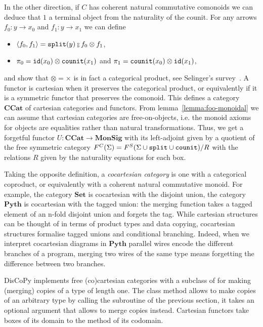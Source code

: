 In the other direction, if $C$ has coherent natural commutative comonoids we can deduce that $1$ a terminal object from the naturality of the counit.
For any arrows $f_0 : y \to x_0$ and $f_1 : y \to x_1$ we can define
\begin{itemize}
\item $\langle f_0, f_1 \rangle = \ttsplit(y) \fcmp f_0 \otimes f_1$,
\item $\pi_0 = \mathtt{id}(x_0) \otimes \mathtt{counit}(x_1)$ and $\pi_1 = \mathtt{counit}(x_0) \otimes \mathtt{id}(x_1)$,
\end{itemize}
and show that $\otimes = \times$ is in fact a categorical product, see Selinger's survey~\cite[Section 6.1]{Selinger10}.
A functor is cartesian when it preserves the categorical product, or equivalently if it is a symmetric functor that preserves the comonoid.
This defines a category $\mathbf{CCat}$ of cartesian categories and functors.
From lemma~\ref{lemma:foo-monoidal} we can assume that cartesian categories are free-on-objects, i.e. the monoid axioms for objects are equalities rather than natural transformations.
Thus, we get a forgetful functor $U : \mathbf{CCat} \to \mathbf{MonSig}$ with its left-adjoint given by a quotient of the free symmetric category $F^C(\Sigma) = F^S(\Sigma \cup \mathtt{split} \cup \mathtt{counit}) / R$ with the relations $R$ given by the naturality equations for each box.

Taking the opposite definition, a \emph{cocartesian category} is one with a categorical coproduct, or equivalently with a coherent natural commutative monoid.
For example, the category $\mathbf{Set}$ is cocartesian with the disjoint union, the category $\mathbf{Pyth}$ is cocartesian with the tagged union: the merging function takes a tagged element of an n-fold disjoint union and forgets the tag.
While cartesian structures can be thought of in terms of product types and data copying, cocartesian structures formalise tagged unions and conditional branching.
Indeed, when we interpret cocartesian diagrams in $\mathbf{Pyth}$ parallel wires encode the different branches of a program, merging two wires of the same type means forgetting the difference between two branches.

DisCoPy implements free (co)cartesian categories with a subclass of  for making (merging)  copies of a type  of length one.
The class method  allows to make  copies of an arbitrary type  by calling the  subroutine of the previous section, it takes an optional argument  that allows to merge copies instead.
Cartesian functors take  boxes of its domain to the  method of its codomain.

